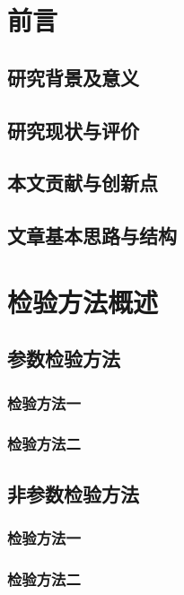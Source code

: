 \documentclass{SUFEThesis}
\begin{document}
\newpage

\thispagestyle{empty}
\heiti
\tableofcontents
\newpage
\songti


\setcounter{page}{1}
\section{前言}
\subsection{研究背景及意义}

\subsection{研究现状与评价}


\subsection{本文贡献与创新点}

\subsection{文章基本思路与结构}


\section{检验方法概述}

\subsection{参数检验方法}

\subsubsection{检验方法一}
\subsubsection{检验方法二}

\subsection{非参数检验方法}

\subsubsection{检验方法一}
\subsubsection{检验方法二}
\end{document}
